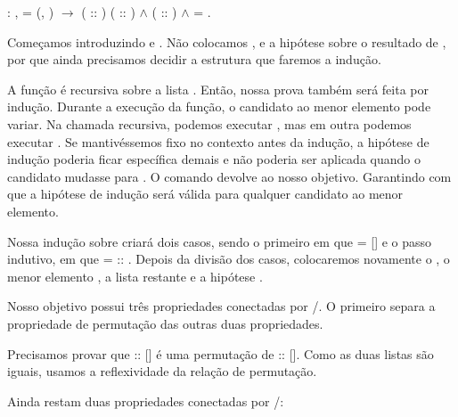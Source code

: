   
\begin{coqdoccode}
\coqdocemptyline
\coqdocnoindent
{}  :\coqdoceol
\coqdocindent{1.00em}
\coqdockw{\ensuremath{\forall}}    ,\coqdoceol
\coqdocindent{2.00em}
   = (, ) \ensuremath{\rightarrow}\coqdoceol
\coqdocindent{2.00em}
 ( :: ) ( :: ) \ensuremath{\land}\coqdoceol
\coqdocindent{2.00em}
  ( :: ) \ensuremath{\land}\coqdoceol
\coqdocindent{2.00em}
  =  .\coqdoceol
\end{coqdoccode}
Começamos introduzindo  e . Não colocamos ,  e a hipótese sobre o resultado de , por que ainda precisamos decidir a estrutura que faremos a indução. 
\begin{coqdoccode}
\end{coqdoccode}
A função  é recursiva sobre a lista . Então, nossa prova também será feita por indução.
      Durante a execução da função, o candidato ao menor elemento pode variar. Na chamada recursiva, podemos executar   , mas em outra podemos executar   .
      Se mantivéssemos  fixo no contexto antes da indução, a hipótese de indução poderia ficar específica demais e não poderia ser aplicada quando o candidato mudasse para .
      O comando   devolve  ao nosso objetivo. Garantindo com que a hipótese de indução será válida para qualquer candidato ao menor elemento. 
\begin{coqdoccode}
\end{coqdoccode}
Nossa indução sobre  criará dois casos, sendo o primeiro em que  = [] e o passo indutivo, em que  =  :: .
      Depois da divisão dos casos, colocaremos novamente o , o menor elemento , a lista restante  e a hipótese . 
\begin{coqdoccode}
\end{coqdoccode}
Nosso objetivo possui três propriedades conectadas por /. O primeiro  separa a propriedade de permutação das outras duas propriedades. 
\begin{coqdoccode}
\end{coqdoccode}
Precisamos provar que  :: [] é uma permutação de  :: []. Como as duas listas são iguais, usamos a reflexividade da relação de permutação. 
\begin{coqdoccode}
\end{coqdoccode}
Ainda restam duas propriedades conectadas por /:

